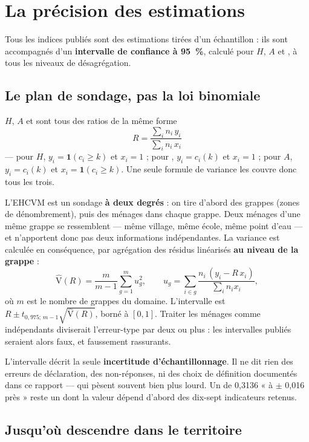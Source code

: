 \documentclass[11pt,a4paper]{article}
\begin{document}
\section{La précision des estimations}

Tous les indices publiés sont des estimations tirées d'un échantillon : ils sont accompagnés
d'un \textbf{intervalle de confiance à 95~\%}, calculé pour $H$, $A$ et \ipm{}, à tous les
niveaux de désagrégation.

\subsection{Le plan de sondage, pas la loi binomiale}

$H$, $A$ et \ipm{} sont tous des ratios de la même forme
\[
R = \frac{\sum_i n_i \, y_i}{\sum_i n_i \, x_i}
\]
--- pour $H$, $y_i = \mathbf{1}(c_i \ge k)$ et $x_i = 1$ ; pour \ipm{}, $y_i = c_i(k)$ et
$x_i = 1$ ; pour $A$, $y_i = c_i(k)$ et $x_i = \mathbf{1}(c_i \ge k)$. Une seule formule de
variance les couvre donc tous les trois.

L'EHCVM est un sondage \textbf{à deux degrés} : on tire d'abord des grappes (zones de
dénombrement), puis des ménages dans chaque grappe. Deux ménages d'une même grappe se
ressemblent --- même village, même école, même point d'eau --- et n'apportent donc pas deux
informations indépendantes. La variance est calculée en conséquence, par agrégation des
résidus linéarisés \textbf{au niveau de la grappe} :
\[
\widehat{\mathrm{V}}(R) = \frac{m}{m-1} \sum_{g=1}^{m} u_g^2,
\qquad
u_g = \sum_{i \in g} \frac{n_i \,(y_i - R\,x_i)}{\sum_i n_i x_i},
\]
où $m$ est le nombre de grappes du domaine. L'intervalle est
$R \pm t_{0{,}975;\,m-1}\sqrt{\widehat{\mathrm{V}}(R)}$, borné à $[0, 1]$. Traiter les ménages
comme indépendants diviserait l'erreur-type par deux ou plus : les intervalles publiés seraient
alors faux, et faussement rassurants.

\begin{retenir}
L'intervalle décrit la seule \textbf{incertitude d'échantillonnage}. Il ne dit rien des erreurs
de déclaration, des non-réponses, ni des choix de définition documentés dans ce rapport --- qui
pèsent souvent bien plus lourd. Un \ipm{} de 0,3136 « à $\pm$ 0,016 près » reste un \ipm{} dont
la valeur dépend d'abord des dix-sept indicateurs retenus.
\end{retenir}

\subsection{Jusqu'où descendre dans le territoire}
\end{document}

